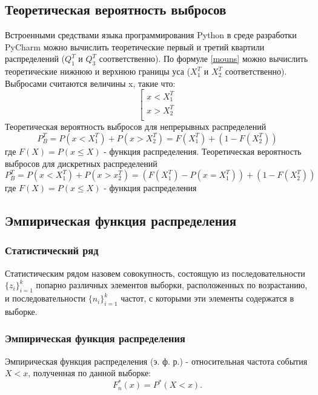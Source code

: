 \documentclass[a4paper]{article}
\begin{document}
\subsection{Теоретическая вероятность выбросов}
	\noindent Встроенными средствами языка программирования Python в среде разработки PyCharm можно вычислить теоретические первый и третий квартили распределений ($Q_1^T$ и $Q_3^T$ соответственно). По формуле \eqref{mouns} можно вычислить теоретические нижнюю и верхнюю границы уса ($X_1^T$ и $X_2^T$ соответственно). Выбросами считаются величины x, такие что:
	\begin{equation}
		\left[
		\begin{gathered}
		x < X_1^T \\
		x > X_2^T \\
		\end{gathered}
		\right.
	\end{equation}
	Теоретическая вероятность выбросов для непрерывных распределений
	\begin{equation}
		P_B^T = P(x<X_1^T) + P(x>X_2^T)=F(X_1^T) + (1-F(X_2^T))
	\end{equation}
	где $F(X)=P(x\leq{X})$ - функция распределения.
	Теоретическая вероятность выбросов для дискретных распределений
	\begin{equation}
		P_B^T = P(x<X_1^T)+P(x>x_2^T)=(F(X_1^T)-P(x=X_1^T))+(1-F(X_2^T))
	\end{equation}
	где $F(X) = P(x\leq{X})$ - функция распределения



	\subsection{Эмпирическая функция распределения}
		\subsubsection{Статистический ряд}
			\noindent Статистическим рядом назовем совокупность, состоящую из последовательности $\displaystyle\{z_i\}_{i=1}^k$ попарно различных элементов выборки, расположенных по возрастанию, и последовательности $\displaystyle\{n_i\}_{i=1}^k$ частот, с которыми эти элементы содержатся в выборке.
		\subsubsection{Эмпирическая функция распределения}
			\noindent Эмпирическая функция распределения (э. ф. р.) - относительная частота события $X < x$, полученная по данной выборке:
			\begin{equation}
				F_n^*(x)=P^*(X<x).
			\end{equation}
\end{document}
